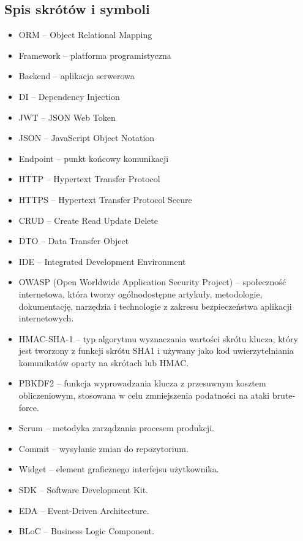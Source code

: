 \documentclass[a4paper,twoside,12pt]{book}
\begin{document}
\begin{appendices}

\chapter{Spis skrótów i symboli}

\begin{itemize}
    \item ORM -- Object Relational Mapping
    \item Framework -- platforma programistyczna
    \item Backend -- aplikacja serwerowa
    \item DI -- Dependency Injection
    \item JWT -- JSON Web Token
    \item JSON -- JavaScript Object Notation
    \item Endpoint -- punkt końcowy komunikacji
    \item HTTP -- Hypertext Transfer Protocol
    \item HTTPS -- Hypertext Transfer Protocol Secure
    \item CRUD -- Create Read Update Delete
    \item DTO -- Data Transfer Object
    \item IDE -- Integrated Development Environment
    \item OWASP (Open Worldwide Application Security Project) -- społeczność internetowa, która tworzy ogólnodostępne artykuły, metodologie, dokumentację, narzędzia i technologie z zakresu bezpieczeństwa aplikacji internetowych.
    \item HMAC-SHA-1 -- typ algorytmu wyznaczania wartości skrótu klucza, który jest tworzony z funkcji skrótu SHA1 i używany jako kod uwierzytelniania komunikatów oparty na skrótach lub HMAC.
    \item PBKDF2 -- funkcja wyprowadzania klucza z przesuwnym kosztem obliczeniowym, stosowana w celu zmniejszenia podatności na ataki brute-force.
    \item Scrum -- metodyka zarządzania procesem produkcji.
    \item Commit -- wysyłanie zmian do repozytorium.
    \item Widget -- element graficznego interfejsu użytkownika.
    \item SDK -- Software Development Kit.
    \item EDA -- Event-Driven Architecture.
    \item BLoC -- Business Logic Component.

\end{itemize}
\end{appendices}
\end{document}
